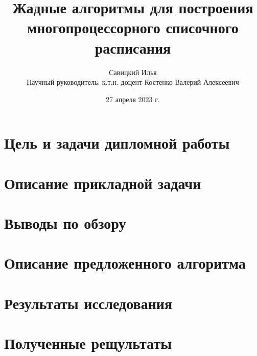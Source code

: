 \documentclass[hyperref=unicode, aspectratio=169]{beamer}
\title[]{Жадные алгоритмы для построения многопроцессорного списочного расписания}
\author[]{Савицкий Илья\\Научный руководитель: к.т.н. доцент Костенко Валерий Алексеевич}
\date{27 апреля 2023 г.}
\begin{document}
\begin{frame}
    \titlepage
\end{frame}

\section{Цель и задачи дипломной работы}


\section{Описание прикладной задачи}


\section{Выводы по обзору}


\section{Описание предложенного алгоритма}


\section{Результаты исследования}


\section{Полученные рещультаты}

\end{document}
